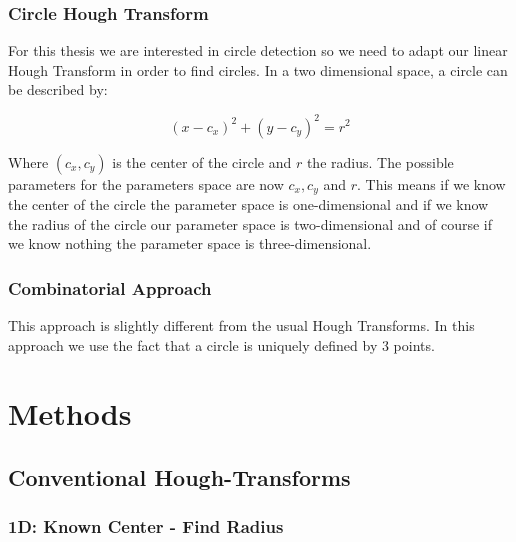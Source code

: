\documentclass[10pt,twoside]{scrreprt}
\begin{document}


\subsection{Circle Hough Transform} %
\label{sub:circle_hough_transform}

For this thesis we are interested in circle detection so we need to adapt our linear Hough Transform in order to find circles. In a two dimensional space, a circle can be described by:

\begin{equation}
		(x-c_x)^2 + (y-c_y)^2 = r^2
\end{equation}

Where $(c_x,c_y)$ is the center of the circle and $r$ the radius. The possible parameters for the parameters space are now $c_x, c_y$ and $r$. This means if we know the center of the circle the parameter space is one-dimensional and if we know the radius of the circle our parameter space is two-dimensional and of course if we know nothing the parameter space is three-dimensional.


\subsection{Combinatorial Approach} %
\label{sub:combinatorial_approach}

This approach is slightly different from the usual Hough Transforms. In this approach we use the fact that a circle is uniquely defined by 3 points.



\chapter{Methods}

\section{Conventional Hough-Transforms} %
\label{sec:conventional_hough_transforms}


\subsection{1D: Known Center - Find Radius} %
\label{sub:1d_known_center_find_radius}
\end{document}
